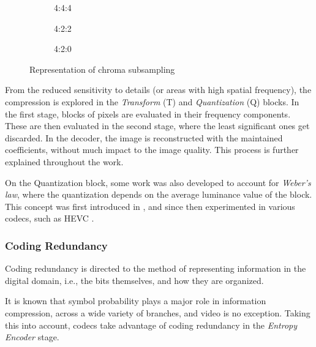 \begin{figure}[h]
    \centering 
        \begin{subfigure}[c]{\textwidth}
            \centering
            
            \caption{4:4:4}
            \label{subfig:444}
        \end{subfigure}
        \begin{subfigure}[c]{\textwidth}
            \centering
            
            \caption{4:2:2}
            \label{subfig:422}
        \end{subfigure}
        \begin{subfigure}[c]{\textwidth}
            \centering
            
            \caption{4:2:0}
            \label{subfig:420}
        \end{subfigure}
       \caption{Representation of chroma subsampling}
    \label{fig:subsample}
\end{figure}

From the reduced sensitivity to details (or areas with high spatial frequency), the compression is explored in the \emph{Transform} (T) and \emph{Quantization} (Q) blocks. In the first stage, blocks of pixels are evaluated in their frequency components. These are then evaluated in the second stage, where the least significant ones get discarded. In the decoder, the image is reconstructed with the maintained coefficients, without much impact to the image quality. This process is further explained throughout the work.

On the Quantization block, some work was also developed to account for \emph{Weber's law}, where the quantization depends on the average luminance value of the block. This concept was first introduced in \cite{watsonEfficiencyModelHuman1988}, and since then experimented in various codecs, such as HEVC \cite{rouisPerceptualVideoContent2018}.

\subsubsection{Coding Redundancy}

Coding redundancy is directed to the method of representing information in the digital domain, i.e., the bits themselves, and how they are organized.

It is known that symbol probability plays a major role in information compression, across a wide variety of branches, and video is no exception. Taking this into account, codecs take advantage of coding redundancy in the \emph{Entropy Encoder} stage.

